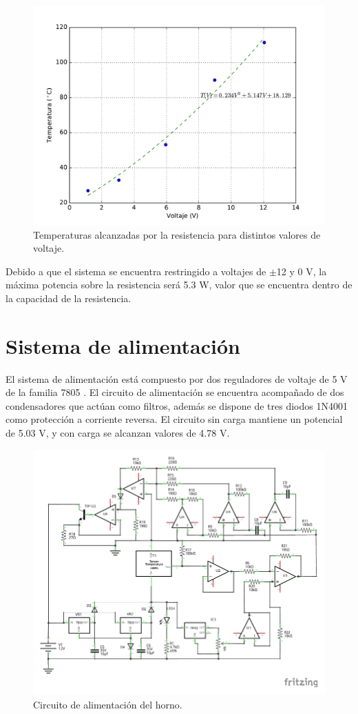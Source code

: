 \documentclass{wileysix}
\begin{document}
\begin{figure}[h]
	\centering
	\includegraphics[width=0.6\linewidth]{extras/actuator.pdf}
	\caption{Temperaturas alcanzadas por la resistencia para distintos valores de voltaje.}
\end{figure}
Debido a que el sistema se encuentra restringido a voltajes de $\pm$12 y 0 V, la m\'axima potencia sobre la resistencia ser\'a 5.3 W, valor que se encuentra dentro de la capacidad de la resistencia.

\section{Sistema de alimentaci\'on}
El sistema de alimentaci\'on est\'a compuesto por dos reguladores de voltaje de 5 V de la familia 7805 \cite{7805}. El circuito de alimentaci\'on se encuentra acompa\~nado de dos condensadores que act\'uan como filtros, adem\'as se dispone de tres diodos 1N4001 \cite{1N4001} como protecci\'on a corriente reversa. El circuito sin carga mantiene un potencial de 5.03 V, y con carga se alcanzan valores de 4.78 V.
\begin{figure}[h]
	\centering
	\includegraphics[width=0.9\linewidth]{extras/alimentacion.pdf}
	\caption{Circuito de alimentaci\'on del horno.}
\end{figure}
\end{document}
